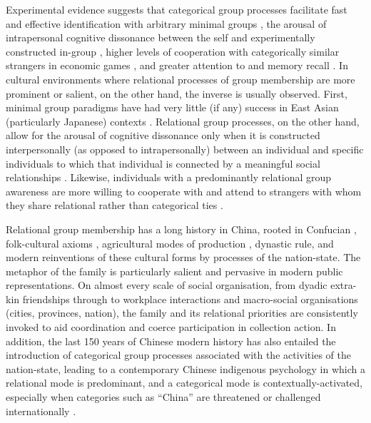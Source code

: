 Experimental evidence suggests that categorical group processes facilitate fast and effective identification with arbitrary minimal groups \citep{Diehl1990,VanBavel2014}, the arousal of intrapersonal cognitive dissonance between the self and experimentally constructed in-group \citep{Festinger1957, Stone2001}, higher levels of cooperation with categorically similar strangers in economic games \citep{Yuki2005,Yuki2003}, and greater attention to and memory recall \citep{Buchan2006,Ng2016}.  In cultural environments where relational processes of group membership are more prominent or salient, on the other hand, the inverse is usually observed. First, minimal group paradigms have had very little (if any) success in East Asian (particularly Japanese) contexts \citep{Liu2009}.  Relational group processes, on the other hand, allow for the arousal of cognitive dissonance only when it is constructed interpersonally (as opposed to intrapersonally) between an individual and specific individuals to which that individual is connected by a meaningful social relationships \citep{Hoshino-Browne2005}.  Likewise, individuals with a predominantly relational group awareness are more willing to cooperate with and attend to strangers with whom they share relational rather than categorical ties \citep{Ng2016,Yuki2005}.

Relational group membership has a long history in China, rooted in Confucian \citep{Hwang1999}, folk-cultural axioms \citep{Wang2009}, agricultural modes of production \citep{Talhelm2014,Fei1992}, dynastic rule, and modern reinventions of these cultural forms by processes of the nation-state\citep{Liu2014}. The metaphor of the family is particularly salient and pervasive in modern public representations.  On almost every scale of social organisation, from dyadic extra-kin friendships through to workplace interactions and macro-social organisations (cities, provinces, nation), the family and its relational priorities are consistently invoked to aid coordination and coerce participation in collection action.
In addition, the last 150 years of Chinese modern history has also entailed the introduction of categorical group processes associated with the activities of the nation-state, leading to a contemporary Chinese indigenous psychology in which a relational mode is predominant, and a categorical mode is contextually-activated, especially when categories such as ``China'' are threatened or challenged internationally \citep{Liu2009}.

